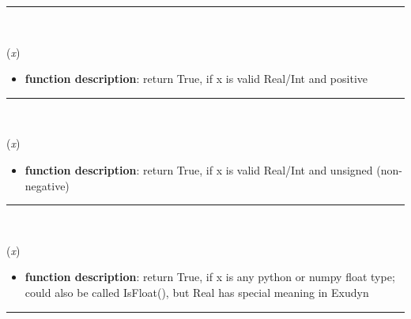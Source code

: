 \begin{itemize}[leftmargin=1.4cm]
%
\noindent\rule{8cm}{0.75pt}\vspace{1pt} \\ 
\begin{flushleft}
\label{sec:advancedUtilities:IsValidPRealInt}
({\it x})
\end{flushleft}
\setlength{\itemindent}{0.7cm}
\begin{itemize}[leftmargin=0.7cm]
\item[--]
{\bf function description}: return True, if x is valid Real/Int and positive
\vspace{12pt}\end{itemize}
%
\noindent\rule{8cm}{0.75pt}\vspace{1pt} \\ 
\begin{flushleft}
\label{sec:advancedUtilities:IsValidURealInt}
({\it x})
\end{flushleft}
\setlength{\itemindent}{0.7cm}
\begin{itemize}[leftmargin=0.7cm]
\item[--]
{\bf function description}: return True, if x is valid Real/Int and unsigned (non-negative)
\vspace{12pt}\end{itemize}
%
\noindent\rule{8cm}{0.75pt}\vspace{1pt} \\ 
\begin{flushleft}
\label{sec:advancedUtilities:IsReal}
({\it x})
\end{flushleft}
\setlength{\itemindent}{0.7cm}
\begin{itemize}[leftmargin=0.7cm]
\item[--]
{\bf function description}: return True, if x is any python or numpy float type; could also be called IsFloat(), but Real has special meaning in Exudyn
\vspace{12pt}\end{itemize}
%
\noindent\rule{8cm}{0.75pt}\vspace{1pt} \\ 
\begin{flushleft}
\label{sec:advancedUtilities:IsInteger}

\end{flushleft}
\end{itemize}
